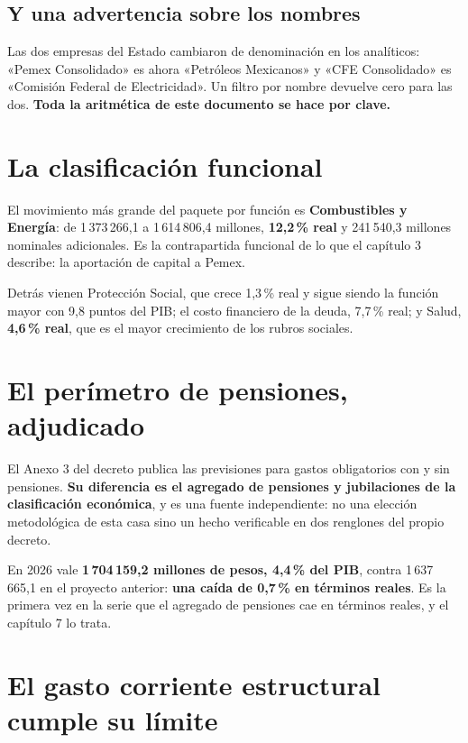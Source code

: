 \subsection{Y una advertencia sobre los nombres}

Las dos empresas del Estado cambiaron de denominación en los analíticos: «Pemex Consolidado»
es ahora «Petróleos Mexicanos» y «CFE Consolidado» es «Comisión Federal de Electricidad». Un
filtro por nombre devuelve cero para las dos. \textbf{Toda la aritmética de este documento se
hace por clave.}

\section{La clasificación funcional}



El movimiento más grande del paquete por función es \textbf{Combustibles y Energía}: de
1\,373\,266,1 a 1\,614\,806,4 millones, \textbf{12,2\,\% real} y 241\,540,3 millones nominales
adicionales. Es la contrapartida funcional de lo que el capítulo 3 describe: la aportación de
capital a Pemex.

Detrás vienen Protección Social, que crece 1,3\,\% real y sigue siendo la función mayor con
9,8 puntos del PIB; el costo financiero de la deuda, 7,7\,\% real; y Salud, \textbf{4,6\,\%
real}, que es el mayor crecimiento de los rubros sociales.

\section{El perímetro de pensiones, adjudicado}



El Anexo 3 del decreto publica las previsiones para gastos obligatorios con y sin pensiones.
\textbf{Su diferencia es el agregado de pensiones y jubilaciones de la clasificación
económica}, y es una fuente independiente: no una elección metodológica de esta casa sino un
hecho verificable en dos renglones del propio decreto.

En 2026 vale \textbf{1\,704\,159,2 millones de pesos, 4,4\,\% del PIB}, contra 1\,637\,665,1
en el proyecto anterior: \textbf{una caída de 0,7\,\% en términos reales}. Es la primera vez
en la serie que el agregado de pensiones cae en términos reales, y el capítulo 7 lo trata.

\section{El gasto corriente estructural cumple su límite}

